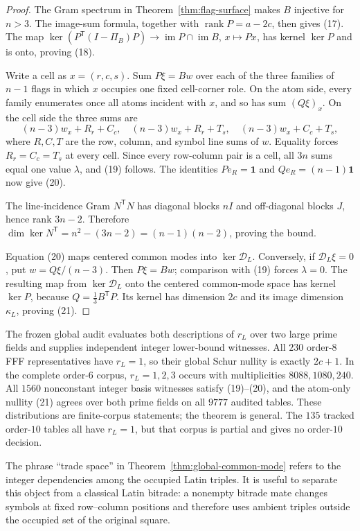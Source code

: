 \begin{proof}
The Gram spectrum in Theorem~\ref{thm:flag-surface} makes $B$ injective for
$n>3$.  The image-sum formula, together with
$\operatorname{rank}P=a-2c$, then gives (17).  The map
$\ker(P^{\mathsf T}(I-\Pi_B)P)\to
\operatorname{im}P\cap\operatorname{im}B$, $x\mapsto Px$, has kernel
$\ker P$ and is onto, proving (18).

Write a cell as $x=(r,c,s)$.  Sum $P\xi=Bw$ over each of the three families
of $n-1$ flags in which $x$ occupies one fixed cell-corner role.  On the
atom side, every family enumerates once all atoms incident with $x$, and so
has sum $(Q\xi)_x$.  On the cell side the three sums are
\[
 (n-3)w_x+R_r+C_c,\quad
 (n-3)w_x+R_r+T_s,\quad
 (n-3)w_x+C_c+T_s,
\]
where $R,C,T$ are the row, column, and symbol line sums of $w$.  Equality
forces $R_r=C_c=T_s$ at every cell.  Since every row-column pair is a cell,
all $3n$ sums equal one value $\lambda$, and (19) follows.  The identities
$Pe_R=\mathbf1$ and $Qe_R=(n-1)\mathbf1$ now give (20).

The line-incidence Gram $N^{\mathsf T}N$ has diagonal blocks $nI$ and
off-diagonal blocks $J$, hence rank $3n-2$.  Therefore
$\dim\ker N^{\mathsf T}=n^2-(3n-2)=(n-1)(n-2)$, proving the bound.

Equation (20) maps centered common modes into $\ker\mathcal D_L$.  Conversely,
if $\mathcal D_L\xi=0$, put $w=Q\xi/(n-3)$.  Then $P\xi=Bw$; comparison with
(19) forces $\lambda=0$.  The resulting map from $\ker\mathcal D_L$ onto the
centered common-mode space has kernel $\ker P$, because
$Q=\tfrac13B^{\mathsf T}P$.  Its kernel has dimension $2c$ and its image
dimension $\kappa_L$, proving (21).
\end{proof}

The frozen global audit evaluates both descriptions of $r_L$ over two large
prime fields and supplies independent integer lower-bound witnesses.  All
$230$ order-$8$ FFF representatives have $r_L=1$, so their global Schur
nullity is exactly $2c+1$.  In the complete order-$6$ corpus,
$r_L=1,2,3$ occurs with multiplicities $8088,1080,240$.  All $1560$
nonconstant integer basis witnesses satisfy (19)--(20), and the atom-only
nullity (21) agrees over both prime fields on all $9777$ audited tables.
These distributions are finite-corpus statements; the theorem is general.
The $135$ tracked order-$10$ tables all have $r_L=1$, but that corpus is
partial and gives no order-$10$ decision.

The phrase ``trade space'' in Theorem~\ref{thm:global-common-mode} refers to
the integer dependencies among the occupied Latin triples.  It is useful to
separate this object from a classical Latin bitrade: a nonempty bitrade mate
changes symbols at fixed row--column positions and therefore uses ambient
triples outside the occupied set of the original square.

